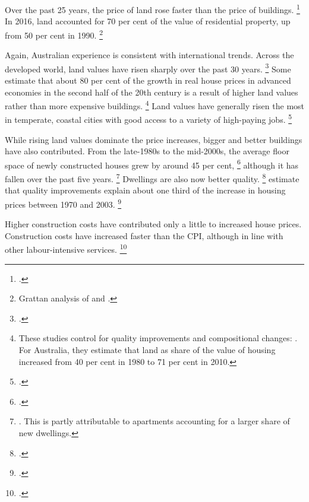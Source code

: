 Over the past 25 years, the price of land rose faster than the price of buildings.%
\footcites{Knoll-et-al-2017-no-price-like-home}{Abelson-and-Chung-2005-realstoryofhousingprices}{FoxFinlay2012}{KohlerandvanderMerwe}{Ellis2015propmarkets}
In 2016, land accounted for 70 per cent of the value of residential property, up from 50 per cent in 1990.%
	\footnote{Grattan analysis of \textcite{ABS-aus-system-of-nat-accounts2016-17} and \textcite{ABS-2017-CPI-Sep}.}



Again, Australian experience is consistent with international trends.
Across the developed world, land values have risen sharply over the past 30 years.%
	\footcite{Knoll-et-al-2017-no-price-like-home}
Some estimate that about 80 per cent of the growth in real house prices in advanced economies in the second half of the 20th century is a result of higher land values rather than more expensive buildings.%
	\footnote{These studies control for quality improvements and compositional changes: \textcite{Knoll-et-al-2017-no-price-like-home}.
For Australia, they estimate that land as share of the value of housing increased from 40 per cent in 1980 to 71 per cent in 2010.}
Land values have generally risen the most in temperate, coastal cities with good access to a variety of high-paying jobs.
	\footcite[][Chapter~1]{HousingAus17}

While rising land values dominate the price increases, bigger and better buildings have also contributed.
From the late-1980s to the mid-2000s, the average floor space of newly constructed houses grew by around 45 per cent,%
	\footcites{Lowe-national-balance-sheet-speech}{Commsec-2016-USovertakesaus}
although it has fallen over the past five years.%
	\footnote{\textcite{Van-onselen-2017-property-rent-seeker}. This is partly attributable to apartments accounting for  a larger share of new dwellings.}
Dwellings are also now better quality.%
	\footcite[][Graph~2]{KohlerandvanderMerwe}
\textcite{Abelson-and-Chung-2005-realstoryofhousingprices} estimate that quality improvements explain about one third of the increase in housing prices between 1970 and 2003.%
	\footcites{Abelson-and-Chung-2005-realstoryofhousingprices}{FoxFinlay2012}

Higher construction costs have contributed only a little to increased house prices.
Construction costs have increased faster than the CPI, although in line with other labour-intensive services.%
	\footcite[][Graph~2]{KohlerandvanderMerwe}

